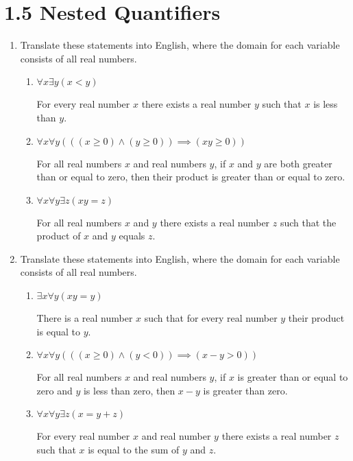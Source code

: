 \documentclass[11pt]{article}
\begin{document}
\section*{\textbf{1.5 Nested Quantifiers}}
\begin{enumerate}[label=\textbf{\arabic*.}]
	\item Translate these statements into English, where the domain for each variable consists of all real numbers.
	\begin{enumerate}[label=\textbf{\alph*)}]
		\item $\forall x\exists y(x < y)$
		
		For every real number $x$ there exists a real number $y$ such that $x$ is less than $y$.
		
		\item $\forall x\forall y(((x \geq 0) \land (y \geq 0)) \implies (xy \geq 0))$
		
		For all real numbers $x$ and real numbers $y$, if $x$ and $y$ are both greater than or equal to zero, then their product is greater than or equal to zero.
		
		\item $\forall x\forall y\exists z(xy = z)$
		
		For all real numbers $x$ and $y$ there exists a real number $z$ such that the product of $x$ and $y$ equals $z$.
	\end{enumerate}

	\item Translate these statements into English, where the domain for each variable consists of all real numbers.
	\begin{enumerate}[label=\textbf{\alph*)}]
		\item $\exists x\forall y(xy = y)$
		
		There is a real number $x$ such that for every real number $y$ their product is equal to $y$.
		
		\item $\forall x\forall y(((x \geq 0) \land (y < 0)) \implies (x - y > 0))$
		
		For all real numbers $x$ and real numbers $y$, if $x$ is greater than or equal to zero and $y$ is less than zero, then $x - y$ is greater than zero.
		
		\item $\forall x\forall y\exists z(x = y + z)$
		
		For every real number $x$ and real number $y$ there exists a real number $z$ such that $x$ is equal to the sum of $y$ and $z$.
	\end{enumerate}


\end{enumerate}
\end{document}
